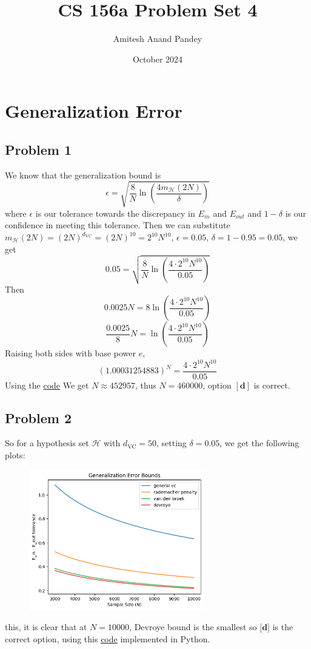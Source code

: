 \documentclass{article}
\title{CS 156a Problem Set 4}
\author{Amitesh Anand Pandey}
\date{October 2024}
\begin{document}
\maketitle
\section*{Generalization Error}
\subsection*{Problem 1}
We know that the generalization bound is
\begin{equation*}
\epsilon = \sqrt{\frac{8}{N}\ln \left(\frac{4m_{\mathcal{H}}(2N)}{\delta}\right)}
\end{equation*}
where $\epsilon$ is our tolerance towards the discrepancy in $E_{in}$ and $E_{out}$ and $1-\delta$ is our confidence in meeting this tolerance. Then we can substitute $m_{\mathcal{H}}(2N) = (2N)^{d_{\text{VC}}} = (2N)^{10} = 2^{10}N^{10}$, $\epsilon = 0.05$, $\delta = 1-0.95 = 0.05$, we get
\begin{equation*}
0.05 = \sqrt{\frac{8}{N}\ln \left(\frac{4\cdot 2^{10}N^{10}}{0.05}\right)}
\end{equation*}
Then
\begin{equation*}
    0.0025N = 8\ln\left(\frac{4 \cdot 2^{10}N^{10}}{0.05}\right)
\end{equation*}
\begin{equation*}
    \frac{0.0025}{8}N = \ln{\left(\frac{4\cdot 2^{10}N^{10}}{0.05}\right)}
\end{equation*}
Raising both sides with base power $e$,
\begin{equation*}
    (1.00031254883)^{N} = \frac{4\cdot 2^{10}N^{10}}{0.05}
\end{equation*}
Using the \hyperref[prob1]{code} We get $N \approx 452957$, thus $N = 460000$, option $[\textbf{d}]$ is correct.\newpage
\subsection*{Problem 2}
So for a hypothesis set $\mathcal{H}$ with $d_{\text{VC}} = 50$, setting $\delta = 0.05$, we get the following plots:
\begin{figure}[htp]
    \centering
    \includegraphics[width=3in]{plotps4.png}
    \label{fig:galaxy}
\end{figure}
 this, it is clear that at $N=10000$, Devroye bound is the smallest so $\textbf{[d]}$ is the correct option, using this \hyperref[prob2]{code} implemented in Python.
\end{document}
